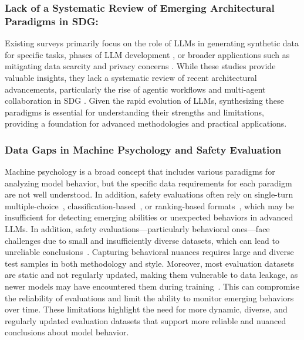 \documentclass[12pt,a4paper]{article}
\begin{document}
\subsubsection{Lack of a Systematic Review of Emerging Architectural Paradigms in SDG:} Existing surveys primarily focus on the role of LLMs in generating synthetic data for specific tasks, phases of LLM development \cite{r2,r97,r98}, or broader applications such as mitigating data scarcity and privacy concerns \cite{r3}. While these studies provide valuable insights, they lack a systematic review of recent architectural advancements, particularly the rise of agentic workflows and multi-agent collaboration in SDG \cite{r10}. Given the rapid evolution of LLMs, synthesizing these paradigms is essential for understanding their strengths and limitations, providing a foundation for advanced methodologies and practical applications.

\subsubsection{Data Gaps in Machine Psychology and Safety Evaluation}
Machine psychology\cite{r-b2-machinepsychology} is a broad concept that includes various paradigms for analyzing model behavior, but the specific data requirements for each paradigm are not well understood. In addition, safety evaluations often rely on single-turn multiple-choice~\cite{trustllm,situationalawareness}, classification-based~\cite{ethics}, or ranking-based formats~\cite{hhhalignment}, which may be insufficient for detecting emerging abilities or unexpected behaviors in advanced LLMs.
In addition, safety evaluations—particularly behavioral ones—face challenges due to small and insufficiently diverse datasets, which can lead to unreliable conclusions~\cite{r-b2-machinepsychology}. Capturing behavioral nuances requires large and diverse test samples in both methodology and style.
Moreover, most evaluation datasets are static and not regularly updated, making them vulnerable to data leakage, as newer models may have encountered them during training~\cite{r-b5,r-b2-machinepsychology}. This can compromise the reliability of evaluations and limit the ability to monitor emerging behaviors over time. These limitations highlight the need for more dynamic, diverse, and regularly updated evaluation datasets that support more reliable and nuanced conclusions about model behavior.
\end{document}
